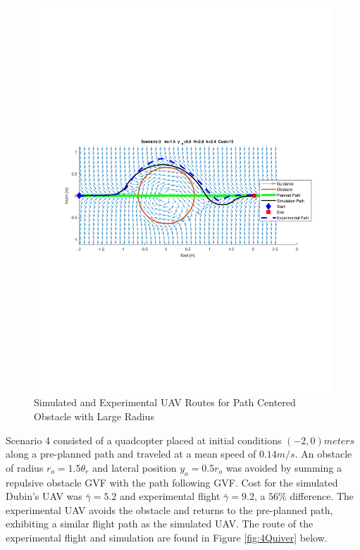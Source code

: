 \documentclass[numbered,pdftex]{ohio-etd}
\begin{document}
\begin{figure}[H]
	\centering
	\includegraphics[trim = 50 250 0 250, clip, width=16.5cm]{Figures/results/compareFigures/3Quiver}
	\caption{Simulated and Experimental UAV Routes for Path Centered Obstacle with Large Radius}
	\label{fig:3Quiver}
\end{figure}

Scenario 4 consisted of a quadcopter placed at initial conditions $(-2,0) meters$ along a pre-planned path and traveled at a mean speed of $0.14 m/s$. An obstacle of radius $r_o = 1.5 \theta_r$ and lateral position $y_o=0.5r_o$ was avoided by summing a repulsive obstacle GVF with the path following GVF. Cost for the simulated Dubin's UAV was $\bar{\gamma} = 5.2$ and experimental flight $\bar{\gamma} = 9.2$, a $56 \%$ difference. The experimental UAV avoids the obstacle and returns to the pre-planned path, exhibiting a similar flight path as the simulated UAV. The route of the experimental flight and simulation are found in Figure \ref{fig:4Quiver} below. 
\end{document}
